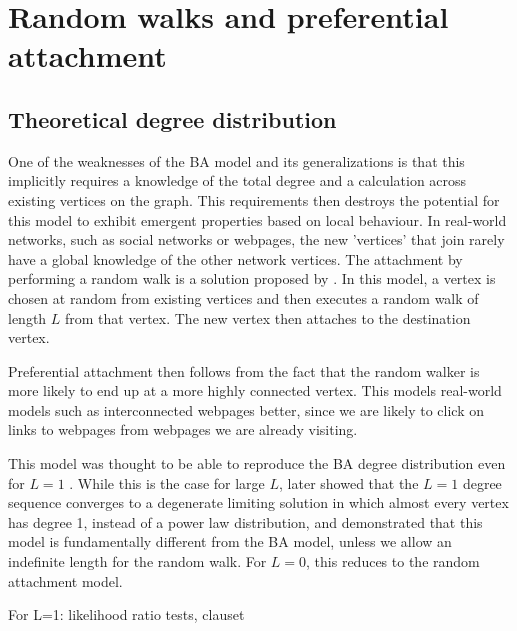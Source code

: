\section{Random walks and preferential attachment}\label{section:random-walk}

\subsection{Theoretical degree distribution}
One of the weaknesses of the BA model and its generalizations is that this implicitly requires a knowledge of the total degree and a calculation across existing vertices on the graph. This requirements then destroys the potential for this model to exhibit emergent properties based on local behaviour. In real-world networks, such as social networks or webpages, the new 'vertices' that join rarely have a global knowledge of the other network vertices. The attachment by performing a random walk is a solution proposed by \citet{Saramaki2004}. In this model, a vertex is chosen at random from existing vertices and then executes a random walk of length $L$ from that vertex. The new vertex then attaches to the destination vertex. 

Preferential attachment then follows from the fact that the random walker is more likely to end up at a more highly connected vertex. This models real-world models such as interconnected webpages better, since we are likely to click on links to webpages from webpages we are already visiting. 

This model was thought to be able to reproduce the BA degree distribution even for $L=1$ \citep{Saramaki2004,J.P.Saramaki2004}. While this is the case for large $L$, \citet{Cannings2013} later showed that the $L=1$ degree sequence converges to a degenerate limiting solution in which almost every vertex has degree 1, instead of a power law distribution, and demonstrated that this model is fundamentally different from the BA model, unless we allow an indefinite length for the random walk. For $L = 0$, this reduces to the random attachment model. 

For L=1: likelihood ratio tests, clauset